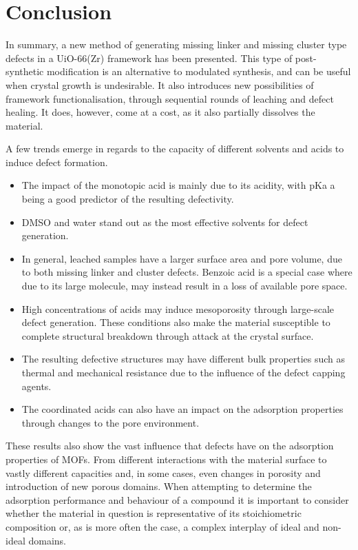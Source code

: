 
\FloatBarrier%
\pagebreak

\section{Conclusion}

In summary, a new method of generating missing linker and missing
cluster type defects in a UiO-66(Zr) framework has been presented.
This type of post-synthetic modification is an alternative to 
modulated synthesis, and can be useful when crystal growth is
undesirable. It also introduces new possibilities of framework
functionalisation, through sequential rounds of leaching and 
defect healing. It does, however, come at a cost, as it also 
partially dissolves the material.

A few trends emerge in regards to the capacity of different solvents 
and acids to induce defect formation.

\begin{itemize}
    \item The impact of the monotopic acid is mainly due to its 
    acidity, with pKa a being a good predictor of the 
    resulting defectivity.
    \item \gls{DMSO} and water stand out as the most effective solvents
    for defect generation.
    \item In general, leached samples have a larger surface 
    area and pore volume, due to both missing linker and cluster
    defects. Benzoic acid is a special case where 
    due to its large molecule, may instead result in a loss of
    available pore space.
    \item High concentrations of acids may induce mesoporosity
    through large-scale defect generation. These conditions also
    make the material susceptible to complete 
    structural breakdown through attack at the crystal surface.
    \item The resulting defective structures may have different 
    bulk properties such as thermal and mechanical resistance due 
    to the influence of the defect capping agents.
    \item The coordinated acids can also have an impact on the
    adsorption properties through changes to the pore environment.

\end{itemize}

These results also show the vast influence that defects have on the 
adsorption properties of \glspl{MOF}. From different interactions with 
the material surface to vastly different capacities and, in some 
cases, even changes in porosity and introduction of new porous domains.
When attempting to determine the adsorption performance and behaviour
of a compound it is important to consider whether the material in 
question is representative of its stoichiometric composition or,
as is more often the case, a complex interplay of ideal and 
non-ideal domains.

\pagebreak